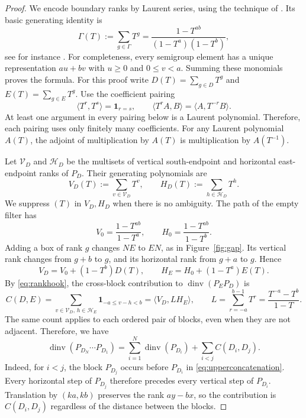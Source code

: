 \documentclass[12pt,reqno]{amsart}
\numberwithin{equation}{section}
\theoremstyle{definition}
\theoremstyle{remark}
\theoremstyle{plain}
\newcommand{\one}{\mathbf1}
\DeclareMathOperator{\dinv}{dinv}
\begin{document}
\begin{proof}
We encode boundary ranks by Laurent series, using the technique of \cite[Lemma~6.16]{HJO}.  Its basic generating identity is
\begin{equation}\label{eq:gammagenerating}
 \Gamma(T):=\sum_{g\in\Gamma}T^g
          =\frac{1-T^{ab}}{(1-T^a)(1-T^b)},
\end{equation}
see for instance \cite{BrownShiue}.
For completeness, every semigroup element has a unique representation
$au+bv$ with $u\ge0$ and $0\le v<a$.  Summing these monomials proves
the formula.
For this proof write
$D(T)=\sum_{g\in D}T^g$ and $E(T)=\sum_{g\in E}T^g$.
Use the coefficient pairing
\begin{equation}\label{eq:laurentpairing}
 \langle T^r,T^s\rangle=\one_{r=s},\qquad
 \langle T^r A,B\rangle=\langle A,T^{-r}B\rangle.
\end{equation}
At least one argument in every pairing below is a Laurent polynomial.  Therefore, each pairing uses only finitely many coefficients. For any Laurent polynomial $A(T)$, the adjoint of multiplication by $A(T)$ is multiplication by
$A(T^{-1})$. 

Let $\mathcal V_D$ and $\mathcal H_D$ be the multisets of vertical
south-endpoint and horizontal east-endpoint ranks of $P_D$.  Their generating polynomials are
\[
 V_D(T):=\sum_{v\in\mathcal V_D}T^v,\qquad
 H_D(T):=\sum_{h\in\mathcal H_D}T^h.
\]
We suppress $(T)$ in $V_D,H_D$ when there is no ambiguity.
The path of the empty filter has
\[
 V_0=\frac{1-T^{ab}}{1-T^a},\qquad
 H_0=\frac{1-T^{ab}}{1-T^b}.
\]
Adding a box of rank $g$ changes $NE$ to $EN$, as in
Figure~\ref{fig:gap}.  Its vertical rank changes from $g+b$ to $g$,
and its horizontal rank from $g+a$ to $g$.  Hence
\begin{equation}\label{eq:rankmeasures}
 V_D=V_0+(1-T^b)D(T),\qquad
 H_E=H_0+(1-T^a)E(T).
\end{equation}
By \eqref{eq:rankhook}, the cross-block contribution to $\dinv(P_EP_D)$ is
\begin{equation}\label{eq:crossdefinition}
 C(D,E)=\sum_{v\in\mathcal V_D,\,h\in\mathcal H_E} \boldsymbol{1}_{-a\leq v-h<b} = \langle V_D,LH_E\rangle,\qquad
 L=\sum_{r=-a}^{b-1}T^r=\frac{T^{-a}-T^b}{1-T}.
\end{equation}
The same count applies to each ordered pair of blocks, even when they
are not adjacent.  Therefore, we have
\begin{equation}\label{eq:dinv-in-cross}
    \dinv(P_{D_N}\cdots P_{D_1})=\sum_{i=1}^N \dinv(P_{D_i}) + \sum_{i<j} C(D_i,D_j).
\end{equation}
Indeed, for $i<j$, the block $P_{D_j}$ occurs before $P_{D_i}$ in
\eqref{eq:upperconcatenation}.  Every horizontal step of $P_{D_j}$
therefore precedes every vertical step of $P_{D_i}$.
Translation by $(ka,kb)$ preserves the rank $ay-bx$, so the contribution
is $C(D_i,D_j)$ regardless of the distance between the blocks.


\end{proof}
\end{document}
